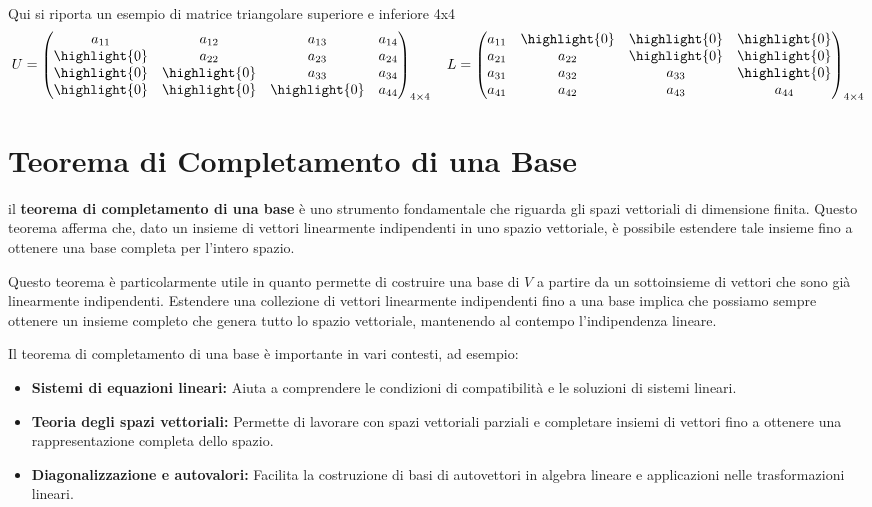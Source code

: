 \leavevmode\\
Qui si riporta un esempio di matrice triangolare superiore e inferiore 4x4
$$
U =
\begin{pmatrix}
  a_{11} & a_{12} & a_{13} & a_{14} \\
  \highlight{0} & a_{22} & a_{23} & a_{24} \\
  \highlight{0} & \highlight{0} & a_{33} & a_{34} \\
  \highlight{0} & \highlight{0} & \highlight{0} & a_{44}
\end{pmatrix}_{4 \times 4}
\quad
L =
\begin{pmatrix}
  a_{11} & \highlight{0} & \highlight{0} & \highlight{0} \\
  a_{21} & a_{22} & \highlight{0} & \highlight{0} \\
  a_{31} & a_{32} & a_{33} & \highlight{0} \\
  a_{41} & a_{42} & a_{43} & a_{44}
\end{pmatrix}_{4 \times 4}
$$

\section{Teorema di Completamento di una Base}

il \textbf{teorema di completamento di una base} è uno strumento fondamentale che riguarda gli spazi vettoriali di dimensione finita. Questo teorema afferma che, dato un insieme di vettori linearmente indipendenti in uno spazio vettoriale, è possibile estendere tale insieme fino a ottenere una base completa per l'intero spazio.

Questo teorema è particolarmente utile in quanto permette di costruire una base di \( V \) a partire da un sottoinsieme di vettori che sono già linearmente indipendenti. Estendere una collezione di vettori linearmente indipendenti fino a una base implica che possiamo sempre ottenere un insieme completo che genera tutto lo spazio vettoriale, mantenendo al contempo l'indipendenza lineare.

Il teorema di completamento di una base è importante in vari contesti, ad esempio:
\begin{itemize}
	\item \textbf{Sistemi di equazioni lineari:} Aiuta a comprendere le condizioni di compatibilità e le soluzioni di sistemi lineari.
	\item \textbf{Teoria degli spazi vettoriali:} Permette di lavorare con spazi vettoriali parziali e completare insiemi di vettori fino a ottenere una rappresentazione completa dello spazio.
	\item \textbf{Diagonalizzazione e autovalori:} Facilita la costruzione di basi di autovettori in algebra lineare e applicazioni nelle trasformazioni lineari.
\end{itemize}

